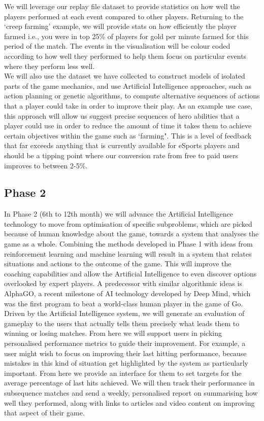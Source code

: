 \documentclass[12pt]{report} %
\begin{document}
We will leverage our replay file dataset to provide statistics on how well the players performed at each event compared to other players. Returning to the `creep farming' example, we will provide stats on how efficiently the player farmed i.e., you were in top 25\% of players for gold per minute farmed for this period of the match. The events in the visualisation will be colour coded according to how well they performed to help them focus on particular events where they perform less well.\\

We will also use the dataset we have collected to construct models of isolated parts of the game mechanics, and use Artificial Intelligence approaches, such as action planning or genetic algorithms, to compute alternative sequences of actions that a player could take in order to improve their play. As an example use case, this approach will allow us suggest precise sequences of hero abilities that a player could use in order to reduce the amount of time it takes them to achieve certain objectives within the game such as `farming". This is a level of feedback that far exceeds anything that is currently available for eSports players and should be a tipping point where our conversion rate from free to paid users improves to between 2-5\%.

\subsection{Phase 2}

In Phase 2 (6th to 12th month) we will advance the Artificial Intelligence technology to move from optimisation of specific subproblems, which are picked because of human knowledge about the game, towards a system that analyses the game as a whole. Combining the methods developed in Phase 1 with ideas from reinforcement learning and machine learning will result in a system that relates situations and actions to the outcome of the game. This will improve the coaching capabilities and allow the Artificial Intelligence to even discover options overlooked by expert players. A predecessor with similar algorithmic ideas is AlphaGO, a recent milestone of AI technology developed by Deep Mind, which was the first program to beat a world-class human player in the game of Go.\\

Driven by the Artificial Intelligence system, we will generate an evaluation of gameplay to the users that actually tells them precisely what leads them to winning or losing matches. From here we will support users in picking personalised performance metrics to guide their improvement. For example, a user might wish to focus on improving their last hitting performance, because mistakes in this kind of situation get highlighted by the system as particularly important. From here we provide an interface for them to set targets for the average percentage of last hits achieved. We will then track their performance in subsequence matches and send a weekly, personalised report on summarising how well they performed, along with links to articles and video content on improving that aspect of their game.
\end{document}
